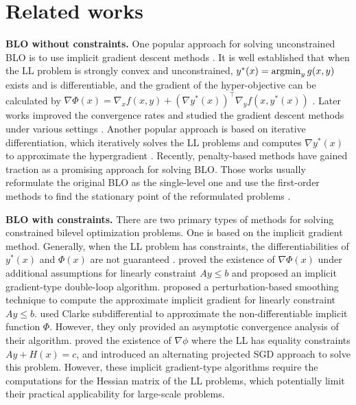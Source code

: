 \documentclass{article}
\newcommand{\argmin}{\mathop{\rm argmin}}
\theoremstyle{plain}
\theoremstyle{definition}
\theoremstyle{remark}
\begin{document}
\section{Related works}\label{section: related works}

\textbf{BLO without constraints.}
One popular approach for solving unconstrained BLO is to use implicit gradient descent methods \citep{pedregosa2016hyperparameter}. It is well established that when the LL problem is strongly convex and unconstrained, $y^*(x)=\argmin_y g(x,y)$ exists and is differentiable, and the gradient of the hyper-objective can be calculated by $\nabla \Phi(x)=\nabla_x f(x,y)+(\nabla y^*(x))^\top \nabla_y f(x,y^*(x))$ \citep{ghadimi2018approximation}. Later works improved the convergence rates and studied the gradient descent methods under various settings \citep{ji2021bilevel, ji2022will, chen2022single, khanduri2021near, yang2023accelerating}. Another popular approach is based on iterative differentiation, which iteratively solves the LL problems and computes $\nabla y^*(x)$ to approximate the hypergradient \citep{maclaurin2015gradient, grazzi2020iteration,liu2021towards, bolte2022automatic}.
Recently, penalty-based methods have gained traction as a promising approach for solving BLO. Those works usually reformulate the original BLO as the single-level one and use the first-order methods to find the stationary point of the reformulated problems \citep{liu2021value, mehra2021penalty, liu2022bome, kwon2023fully, shen2023penalty, gao2022value, lu2024slm, lu2024first}.

\textbf{BLO with constraints.}
There are two primary types of methods for solving constrained bilevel optimization problems. One is based on the implicit gradient method. Generally, when the LL problem has constraints, the differentiabilities of $y^*(x)$ and $\Phi(x)$ are not guaranteed \citep{khanduri2023linearly}. 
\cite{tsaknakis2022implicit} proved the existence of $\nabla \Phi(x)$ under additional assumptions for linearly constraint $Ay\leq b$ and proposed an implicit gradient-type double-loop algorithm.  \cite{khanduri2023linearly} proposed a perturbation-based smoothing technique to compute the approximate implicit gradient for linearly constraint $Ay\leq b$. \cite{xu2023efficient} used Clarke subdifferential to approximate the non-differentiable implicit function $\Phi$. However, they only provided an asymptotic convergence analysis of their algorithm. \cite{xiao2023alternating} proved the existence of $\nabla \phi$  where the LL has equality constraints $Ay+H(x)=c$, and introduced an alternating projected SGD approach to solve this problem.
However, these implicit gradient-type algorithms \citep{tsaknakis2022implicit, khanduri2023linearly, xu2023efficient, xiao2023alternating} require the computations for the Hessian matrix of the LL problems, which potentially limit their practical applicability for large-scale problems.
\end{document}
